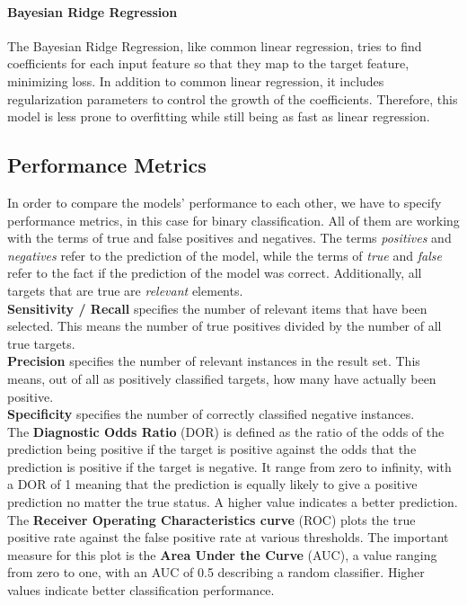 \documentclass[conference,comsoc]{IEEEtran}
\begin{document}
\paragraph{Bayesian Ridge Regression}
The Bayesian Ridge Regression, like common linear regression, tries to find coefficients for each input feature so that they map to the target feature, minimizing loss.
In addition to common linear regression, it includes regularization parameters to control the growth of the coefficients.
Therefore, this model is less prone to overfitting while still being as fast as linear regression.


\subsection{Performance Metrics}
In order to compare the models' performance to each other, we have to specify performance metrics, in this case for binary classification.
All of them are working with the terms of true and false positives and negatives.
The terms \emph{positives} and \emph{negatives} refer to the prediction of the model, while the terms of \emph{true} and \emph{false} refer to the fact if the prediction of the model was correct.
Additionally, all targets that are true are \emph{relevant} elements. \\
\textbf{Sensitivity / Recall} specifies the number of relevant items that have been selected.
This means the number of true positives divided by the number of all true targets. \\
\textbf{Precision} specifies the number of relevant instances in the result set.
This means, out of all as positively classified targets, how many have actually been positive. \\
\textbf{Specificity} specifies the number of correctly classified negative instances. \\
The \textbf{Diagnostic Odds Ratio} (DOR) is defined as the ratio of the odds of the prediction being positive if the target is positive against the odds that the prediction is positive if the target is negative.
It range from zero to infinity, with a DOR of 1 meaning that the prediction is equally likely to give a positive prediction no matter the true status.
A higher value indicates a better prediction. \\
The \textbf{Receiver Operating Characteristics curve} (ROC) plots the true positive rate against the false positive rate at various thresholds.
The important measure for this plot is the \textbf{Area Under the Curve} (AUC), a value ranging from zero to one, with an AUC of 0.5 describing a random classifier.
Higher values indicate better classification performance.
\end{document}
